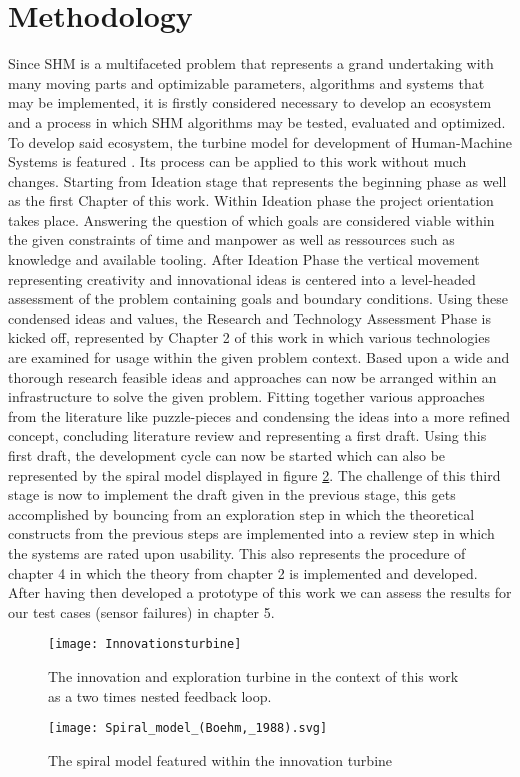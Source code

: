 \section{Methodology}

Since SHM is a multifaceted problem that represents a grand undertaking with many moving parts and optimizable parameters, algorithms and systems that may be implemented, it is firstly considered necessary to develop an ecosystem and a process in which SHM algorithms may be tested, evaluated and optimized. To develop said ecosystem, the turbine model for development of Human-Machine Systems is featured \cite{adlakha-hutcheon_human_2022}. Its process can be applied to this work without much changes. Starting from Ideation stage that represents the beginning phase as well as the first Chapter of this work. Within Ideation phase the project orientation takes place. Answering the question of which goals are considered viable within the given constraints of time and manpower as well as ressources such as knowledge and available tooling.
After Ideation Phase the vertical movement representing creativity and innovational ideas is centered into a level-headed assessment of the problem containing goals and boundary conditions. Using these condensed ideas and values, the Research and Technology Assessment Phase is kicked off, represented by Chapter 2 of this work in which various technologies are examined for usage within the given problem context. Based upon a wide and thorough research feasible ideas and approaches can now be arranged within an infrastructure to solve the given problem. Fitting together various approaches from the literature like puzzle-pieces and condensing the ideas into a more refined concept, concluding literature review and representing a first draft. Using this first draft, the development cycle can now be started which can also be represented by the spiral model displayed in figure \ref{fig:spiral model}. The challenge of this third stage is now to implement the draft given in the previous stage, this gets accomplished by bouncing from an exploration step in which the theoretical constructs from the previous steps are implemented into a review step in which the systems are rated upon usability. This also represents the procedure of chapter 4 in which the theory from chapter 2 is implemented and developed. After having then developed a prototype of this work we can assess the results for our test cases (sensor failures) in chapter 5.




\begin{figure}[h]
    \centering
    \texttt{[image: Innovationsturbine]}
    \caption{The innovation and exploration turbine in the context of this work as a two times nested feedback loop. \cite{adlakha-hutcheon_human_2022}}
    \label{fig:innovation_turbine}
\end{figure}

\begin{figure}[h]
    \centering
    \texttt{[image: Spiral\_model\_(Boehm,\_1988).svg]}
    \caption{The spiral model featured within the innovation turbine \cite{boehm_spiral_1986}}
    \label{fig:spiral model}
\end{figure}


